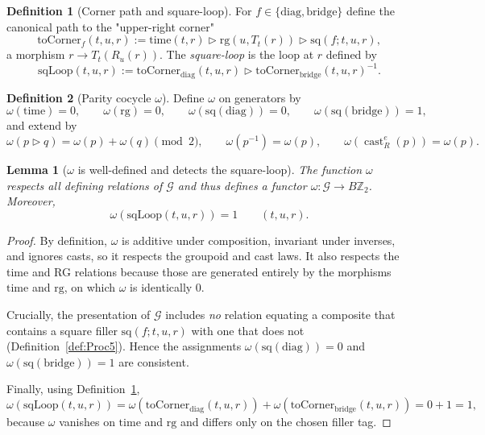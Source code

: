 \documentclass[aps,prl,reprint]{revtex4-2}
\newcommand{\castR}[2]{\operatorname{cast}_R^{#1}\!\left(#2\right)}
\newcommand{\Ztwo}{\mathbb{Z}_2}
\theoremstyle{definition}
\newtheorem{definition}{Definition}[section]
\theoremstyle{plain}
\newtheorem{lemma}{Lemma}[section]
\begin{document}
\begin{definition}[Corner path and square-loop]
\label{def:sqloop}
For $f\in\{\mathrm{diag},\mathrm{bridge}\}$ define the canonical path to the
"upper-right corner"
\[
  \mathrm{toCorner}_f(t,u,r)
  :=\mathrm{time}(t,r)\triangleright\mathrm{rg}(u,T_t(r))\triangleright\mathrm{sq}(f;t,u,r),
\]
a morphism $r\to T_t(R_u(r))$.
The \emph{square-loop} is the loop at $r$ defined by
\[
  \mathrm{sqLoop}(t,u,r):=\mathrm{toCorner}_{\mathrm{diag}}(t,u,r)\triangleright
  \mathrm{toCorner}_{\mathrm{bridge}}(t,u,r)^{-1}.
\]
\end{definition}

\begin{definition}[Parity cocycle $\omega$]
\label{def:limited-scope-theorem-translation-clean-003}
Define $\omega$ on generators by
\[\omega(\mathrm{time})=0,\qquad \omega(\mathrm{rg})=0,\qquad
\omega(\mathrm{sq}(\mathrm{diag}))=0,\qquad \omega(\mathrm{sq}(\mathrm{bridge}))=1,\]
and extend by
\[
\omega(p\triangleright q)=\omega(p)+\omega(q)\pmod 2,\qquad
\omega(p^{-1})=\omega(p),\qquad
\omega(\castR{e}{p})=\omega(p).
\]
\end{definition}

\begin{lemma}[$\omega$ is well-defined and detects the square-loop]
\label{lem:omega}
The function $\omega$ respects all defining relations of $\mathcal G$ and thus
defines a functor $\omega:\mathcal G\to B\Ztwo$. Moreover,
\[\omega(\mathrm{sqLoop}(t,u,r))=1\qquad (t,u,r).\]

\end{lemma}

\begin{proof}
By definition, $\omega$ is additive under composition, invariant under inverses,
and ignores casts, so it respects the groupoid and cast laws. It also respects the
time and RG relations because those are generated entirely by the morphisms
$\mathrm{time}$ and $\mathrm{rg}$, on which $\omega$ is identically $0$.

Crucially, the presentation of $\mathcal G$ includes \emph{no} relation equating a
composite that contains a square filler $\mathrm{sq}(f;t,u,r)$ with one that does
not (Definition~\ref{def:Proc5}). Hence the assignments
$\omega(\mathrm{sq}(\mathrm{diag}))=0$ and $\omega(\mathrm{sq}(\mathrm{bridge}))=1$ are
consistent.

Finally, using Definition~\ref{def:sqloop},
\[
\omega(\mathrm{sqLoop}(t,u,r))
=\omega(\mathrm{toCorner}_{\mathrm{diag}}(t,u,r))
+\omega(\mathrm{toCorner}_{\mathrm{bridge}}(t,u,r))
=0+1=1,
\]
because $\omega$ vanishes on $\mathrm{time}$ and $\mathrm{rg}$ and differs only on the
chosen filler tag.
\end{proof}
\end{document}
